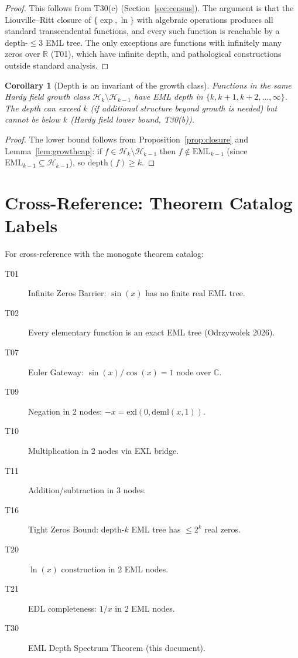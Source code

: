 \documentclass[12pt,a4paper]{article}
\newtheorem{corollary}[theorem]{Corollary}
\theoremstyle{definition}
\theoremstyle{remark}
\begin{document}
\begin{proof}
This follows from T30(c) (Section~\ref{sec:census}).  The argument is that
the Liouville--Ritt closure of $\{\exp, \ln\}$ with algebraic operations
produces all standard transcendental functions, and every such function is
reachable by a depth-$\leq 3$ EML tree.  The only exceptions are functions
with infinitely many zeros over $\mathbb{R}$ (T01), which have infinite depth,
and pathological constructions outside standard analysis.
\end{proof}

\begin{corollary}[Depth is an invariant of the growth class]\label{cor:growth}
Functions in the same Hardy field growth class $\mathcal{H}_k\setminus\mathcal{H}_{k-1}$
have EML depth in $\{k, k+1, k+2, \ldots, \infty\}$.  The depth can exceed $k$
(if additional structure beyond growth is needed) but cannot be below $k$
(Hardy field lower bound, T30(b)).
\end{corollary}

\begin{proof}
The lower bound follows from Proposition~\ref{prop:closure} and
Lemma~\ref{lem:growthcap}: if $f\in\mathcal{H}_k\setminus\mathcal{H}_{k-1}$
then $f\notin\mathrm{EML}_{k-1}$ (since $\mathrm{EML}_{k-1}\subseteq\mathcal{H}_{k-1}$),
so $\mathrm{depth}(f)\geq k$.
\end{proof}

\section{Cross-Reference: Theorem Catalog Labels}

For cross-reference with the monogate theorem catalog:

\begin{description}
  \item[T01] Infinite Zeros Barrier: $\sin(x)$ has no finite real EML tree.
  \item[T02] Every elementary function is an exact EML tree (Odrzywołek 2026).
  \item[T07] Euler Gateway: $\sin(x)/\cos(x)=1$ node over $\mathbb{C}$.
  \item[T09] Negation in 2 nodes: $-x=\mathrm{exl}(0,\mathrm{deml}(x,1))$.
  \item[T10] Multiplication in 2 nodes via EXL bridge.
  \item[T11] Addition/subtraction in 3 nodes.
  \item[T16] Tight Zeros Bound: depth-$k$ EML tree has $\leq 2^k$ real zeros.
  \item[T20] $\ln(x)$ construction in 2 EML nodes.
  \item[T21] EDL completeness: $1/x$ in 2 EML nodes.
  \item[T30] EML Depth Spectrum Theorem (this document).
\end{description}
\end{document}
